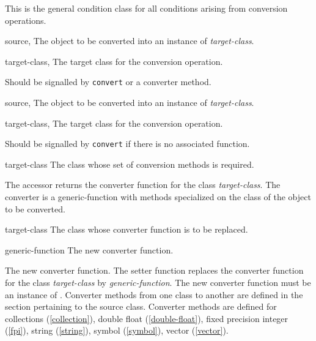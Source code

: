 \begin{optDefinition}
%
This is the general condition class for all conditions arising from conversion
operations.
%
\begin{initoptions}
    \item[source, \classref{object}] The object to be converted into an instance
    of {\em target-class}.
    \item[target-class, \classref{class}] The target class for the conversion
    operation.
\end{initoptions}
%
\remarks%
Should be signalled by {\tt convert} or a converter method.

%
\begin{initoptions}
    \item[source, \classref{object}] The object to be converted into an instance
    of {\em target-class}.
    \item[target-class, \classref{class}] The target class for the conversion
    operation.
\end{initoptions}
%
\remarks%
Should be signalled by {\tt convert} if there is no associated function.

%
\begin{arguments}
    \item[target-class] The class whose set of conversion methods is required.
\end{arguments}
%
\result%
The accessor returns the converter function for the class {\em
    target-class}.  The converter is a generic-function with methods specialized
on the class of the object to be converted.

%
\begin{arguments}
    \item[target-class] The class whose converter function is to be replaced.
    \item[generic-function] The new converter function.
\end{arguments}
%
\result%
The new converter function.  The setter function replaces the converter
function for the class {\em target-class\/} by {\em generic-function}.  The new
converter function must be an instance of {\tt <generic-function>}.
%
\remarks%
Converter methods from one class to another are defined in the section
pertaining to the source class.
%
\seealso%
Converter methods are defined for collections (\ref{collection}), double
float (\ref{double-float}), fixed precision integer (\ref{fpi}),
string (\ref{string}), symbol (\ref{symbol}), vector (\ref{vector}).
%
\end{optDefinition}
